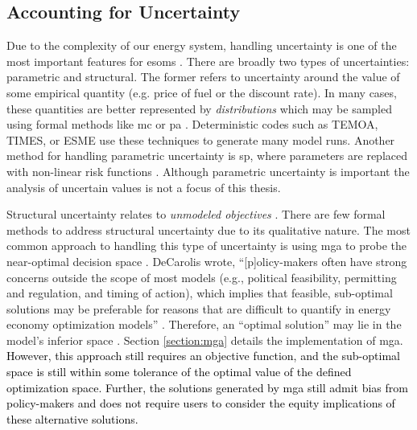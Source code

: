 \subsection{Accounting for Uncertainty}
\label{section:uncertainty}
Due to the complexity of our energy system, handling uncertainty is one of the
most important features for \acp{esom} \cite{yue_review_2018,
decarolis_using_2011}. There are broadly two types of uncertainties: parametric
and structural. The former refers to uncertainty around the value of some
empirical quantity (e.g. price of fuel or the discount rate). In many cases,
these quantities are better represented by \textit{distributions} which may be
sampled using formal methods like \ac{mc} or \ac{pa}
\cite{pfenninger_energy_2014, yue_review_2018}. Deterministic codes such as
TEMOA, TIMES, or ESME use these techniques to generate many model runs. Another
method for handling parametric uncertainty is \ac{sp}, where parameters are
replaced with non-linear risk functions \cite{yue_review_2018,
decarolis_multi-stage_2012}. Although parametric uncertainty is important the
analysis of uncertain values is not a focus of this thesis.

Structural uncertainty relates to \textit{unmodeled objectives}
\cite{yue_review_2018, decarolis_using_2011, decarolis_modelling_2016}. There
are few formal methods to address structural uncertainty due to its qualitative
nature. The most common approach to handling this type of uncertainty is using
\ac{mga} to probe the near-optimal decision space \cite{brill_mga_1990,
jenkins_genx_2022, decarolis_using_2011, neumann_near-optimal_2021,
pfenninger_energy_2014}. DeCarolis wrote, ``[p]olicy-makers often have strong
concerns outside the scope of most models (e.g., political feasibility,
permitting and regulation, and timing of action), which implies that feasible,
sub-optimal solutions may be preferable for reasons that are difficult to
quantify in energy economy optimization models'' \cite{decarolis_using_2011}.
Therefore, an ``optimal solution'' may lie in the model's inferior space
\cite{decarolis_using_2011}. Section \ref{section:mga} details the
implementation of \ac{mga}. \textcolor{black}{However, this approach still
requires an objective function, and the sub-optimal space is still within some
tolerance of the optimal value of the defined optimization space. Further, the
solutions generated by \ac{mga} still admit bias from policy-makers and does not
require users to consider the equity implications of these alternative
solutions.} 


